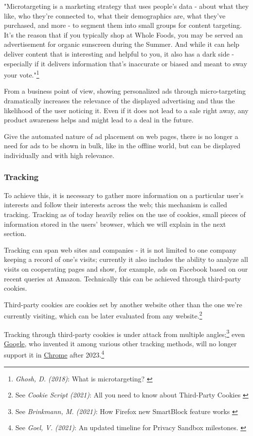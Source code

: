 "Microtargeting is a marketing strategy that uses people’s data - about what they like, who they’re connected to, what their demographics are, what they’ve purchased, and more - to segment them into small groups for content targeting. It’s the reason that if you typically shop at Whole Foods, you may be served an advertisement for organic sunscreen during the Summer. And while it can help deliver content that is interesting and helpful to you, it also has a dark side - especially if it delivers information that’s inaccurate or biased and meant to sway your vote."\footnote{\textit{Ghosh, D. (2018)}: What is microtargeting? \cite{mozillaBlog}}

From a business point of view, showing personalized ads through micro-targeting dramatically increases the relevance of the displayed advertising and thus the likelihood of the user noticing it. Even if it does not lead to a sale right away, any product awareness helps and might lead to a deal in the future. 

Give the automated nature of ad placement on web pages, there is no longer a need for ads to be shown in bulk, like in the offline world, but can be displayed individually and with high relevance. 

\subsubsection{Tracking}

To achieve this, it is necessary to gather more information on a particular user's interests and follow their interests across the web; this mechanism is called tracking. Tracking as of today heavily relies on the use of cookies, small pieces of information stored in the users' browser, which we will explain in the next section.

Tracking can span web sites and companies - it is not limited to one company keeping a record of one's visits; currently it also includes the ability to analyze all visits on cooperating pages and show, for example, ads on Facebook based on our recent queries at Amazon. Technically this can be achieved through third-party cookies.

Third-party cookies are cookies set by another website other than the one we're currently visiting, which can be later evaluated from any website.\footnote{See \textit{Cookie Script (2021)}: All you need to know about Third-Party Cookies \cite{mozillaBlog}}

Tracking through third-party cookies is under attack from multiple angles;\footnote{See \textit{Brinkmann, M. (2021)}: How Firefox new SmartBlock feature works \cite{mozillaBlog}} even \href{https://www.google.com/}{Google}, who invented it among various other tracking methods, will no longer support it in \href{https://www.google.com/chrome/}{Chrome} after 2023.\footnote{See \textit{Goel, V. (2021)}: An updated timeline for Privacy Sandbox milestones. \cite{sandboxDelay}}

